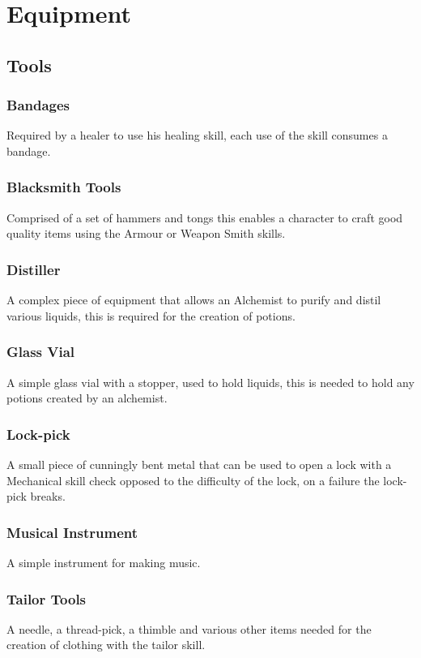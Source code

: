 \section{Equipment}
\subsection{Tools}

\subsubsection*{Bandages}
Required by a healer to use his healing skill, each use of the skill consumes a bandage.

\subsubsection*{Blacksmith Tools}
Comprised of a set of hammers and tongs this enables a character to craft good quality items using the Armour or Weapon Smith skills.

\subsubsection*{Distiller}
A complex piece of equipment that allows an Alchemist to purify and distil various liquids, this is required for the creation of potions.

\subsubsection*{Glass Vial}
A simple glass vial with a stopper, used to hold liquids, this is needed to hold any potions created by an alchemist.

\subsubsection*{Lock-pick}
A small piece of cunningly bent metal that can be used to open a lock with a Mechanical skill check opposed to the difficulty of the lock, on a failure the lock-pick breaks.

\subsubsection*{Musical Instrument}
A simple instrument for making music.

\subsubsection*{Tailor Tools}
A needle, a thread-pick, a thimble and various other items needed for the creation of clothing with the tailor skill.

